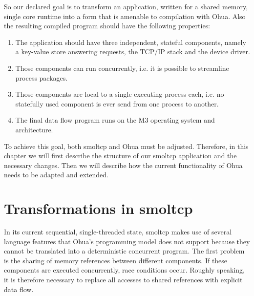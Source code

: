 So our declared goal is to transform an application, written for a shared memory, single core runtime into a form that is amenable to compilation with Ohua. Also the resulting compiled program should have the following properties:
\begin{enumerate}
    \item The application should have three independent, stateful components, namely a key-value store answering requests, the TCP/IP stack and the device driver. 
    \item Those components can run concurrently, i.e. it is possible to streamline process packages. 
    \item Those components are local to a single executing process each, i.e. no statefully used component is ever send from one process to another.
    \item The final data flow program runs on the M3 operating system and architecture.
\end{enumerate}

To achieve this goal, both smoltcp and Ohua must be adjusted. Therefore, in this chapter we will first describe the structure of our smoltcp application and the necessary changes. Then we will describe how the current functionality of Ohua needs to be adapted and extended. 

\section{Transformations in smoltcp}
\label{sec:ImplSmoltcp}

In its current sequential, single-threaded state, smoltcp makes use of several language features that Ohua's programming model does not support because they cannot be translated into a deterministic concurrent program. The first problem is the sharing of memory references between different components. If these components are executed concurrently, race conditions occur. Roughly speaking, it is therefore necessary to replace all accesses to shared references with explicit data flow.\\

